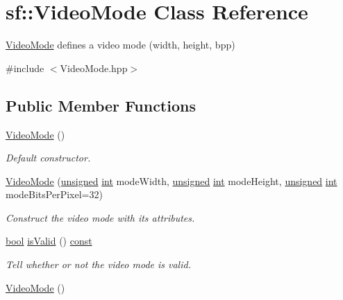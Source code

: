 \hypertarget{classsf_1_1_video_mode}{\section{sf\-:\-:Video\-Mode Class Reference}
\label{classsf_1_1_video_mode}
}


\hyperlink{classsf_1_1_video_mode}{Video\-Mode} defines a video mode (width, height, bpp)  




{\ttfamily \#include $<$Video\-Mode.\-hpp$>$}

\subsection*{Public Member Functions}
\begin{DoxyCompactItemize}
\item 
\hyperlink{classsf_1_1_video_mode_a04c9417e5c304510bef5f6aeb03f6ce1}{Video\-Mode} ()
\begin{DoxyCompactList}\small\item\em Default constructor. \end{DoxyCompactList}\item 
\hyperlink{classsf_1_1_video_mode_a46c35ed41de9e115661dcd529d64e9d3}{Video\-Mode} (\hyperlink{curses_8priv_8h_aca40206900cfc164654362fa8d4ad1e6}{unsigned} \hyperlink{term__entry_8h_ad65b480f8c8270356b45a9890f6499ae}{int} mode\-Width, \hyperlink{curses_8priv_8h_aca40206900cfc164654362fa8d4ad1e6}{unsigned} \hyperlink{term__entry_8h_ad65b480f8c8270356b45a9890f6499ae}{int} mode\-Height, \hyperlink{curses_8priv_8h_aca40206900cfc164654362fa8d4ad1e6}{unsigned} \hyperlink{term__entry_8h_ad65b480f8c8270356b45a9890f6499ae}{int} mode\-Bits\-Per\-Pixel=32)
\begin{DoxyCompactList}\small\item\em Construct the video mode with its attributes. \end{DoxyCompactList}\item 
\hyperlink{term__entry_8h_a002004ba5d663f149f6c38064926abac}{bool} \hyperlink{classsf_1_1_video_mode_aa64ff5420dde3b31c24b9c4e2be9cd9c}{is\-Valid} () \hyperlink{term__entry_8h_a57bd63ce7f9a353488880e3de6692d5a}{const} 
\begin{DoxyCompactList}\small\item\em Tell whether or not the video mode is valid. \end{DoxyCompactList}\item 
\hyperlink{classsf_1_1_video_mode_a04c9417e5c304510bef5f6aeb03f6ce1}{Video\-Mode} ()

\end{DoxyCompactItemize}
